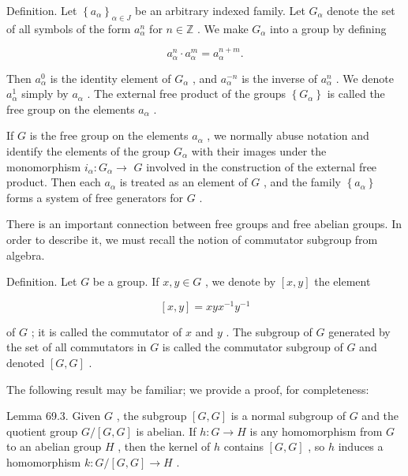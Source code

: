 Definition. Let \({\left\{  {a}_{\alpha }\right\}  }_{\alpha  \in  J}\) be an arbitrary indexed family. Let \({G}_{\alpha }\) denote the set of all symbols of the form \({a}_{\alpha }^{n}\) for \(n \in  \mathbb{Z}\) . We make \({G}_{\alpha }\) into a group by defining

\[
{a}_{\alpha }^{n} \cdot  {a}_{\alpha }^{m} = {a}_{\alpha }^{n + m}.
\]

Then \({a}_{\alpha }^{0}\) is the identity element of \({G}_{\alpha }\) , and \({a}_{\alpha }^{-n}\) is the inverse of \({a}_{\alpha }^{n}\) . We denote \({a}_{\alpha }^{1}\) simply by \({a}_{\alpha }\) . The external free product of the groups \(\left\{  {G}_{\alpha }\right\}\) is called the free group on the elements \({a}_{\alpha }\) .

If \(G\) is the free group on the elements \({a}_{\alpha }\) , we normally abuse notation and identify the elements of the group \({G}_{\alpha }\) with their images under the monomorphism \({i}_{\alpha } : {G}_{\alpha } \rightarrow\)  \(G\) involved in the construction of the external free product. Then each \({a}_{\alpha }\) is treated as an element of \(G\) , and the family \(\left\{  {a}_{\alpha }\right\}\) forms a system of free generators for \(G\) .

There is an important connection between free groups and free abelian groups. In order to describe it, we must recall the notion of commutator subgroup from algebra.

Definition. Let \(G\) be a group. If \(x,y \in  G\) , we denote by \(\left\lbrack  {x,y}\right\rbrack\) the element

\[
\left\lbrack  {x,y}\right\rbrack   = {xy}{x}^{-1}{y}^{-1}
\]

of \(G\) ; it is called the commutator of \(x\) and \(y\) . The subgroup of \(G\) generated by the set of all commutators in \(G\) is called the commutator subgroup of \(G\) and denoted \(\left\lbrack  {G,G}\right\rbrack\) .

The following result may be familiar; we provide a proof, for completeness:

Lemma 69.3. Given \(G\) , the subgroup \(\left\lbrack  {G,G}\right\rbrack\) is a normal subgroup of \(G\) and the quotient group \(G/\left\lbrack  {G,G}\right\rbrack\) is abelian. If \(h : G \rightarrow  H\) is any homomorphism from \(G\) to an abelian group \(H\) , then the kernel of \(h\) contains \(\left\lbrack  {G,G}\right\rbrack\) , so \(h\) induces a homomorphism \(k : G/\left\lbrack  {G,G}\right\rbrack   \rightarrow  H\) .

